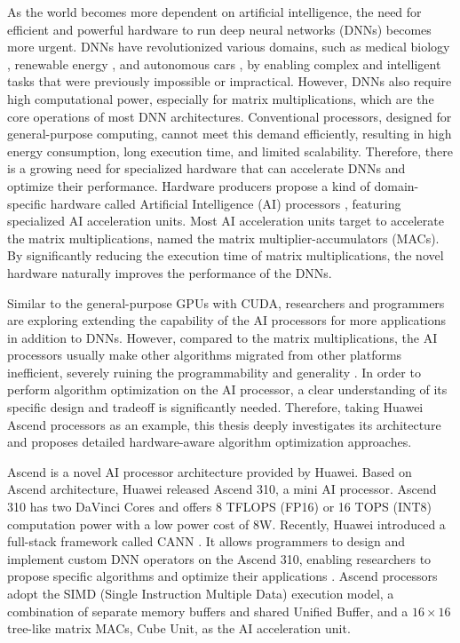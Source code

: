 \documentclass[12pt]{extbook}
\begin{document}
As the world becomes more dependent on artificial intelligence, the need for efficient and powerful hardware to run deep neural networks (DNNs) becomes more urgent. DNNs have revolutionized various domains, such as medical biology \cite{zitnik2019machine}, renewable energy \cite{gensler2016deep}, and autonomous cars \cite{tian2018deeptest}, by enabling complex and intelligent tasks that were previously impossible or impractical. However, DNNs also require high computational power, especially for matrix multiplications, which are the core operations of most DNN architectures. Conventional processors, designed for general-purpose computing, cannot meet this demand efficiently, resulting in high energy consumption, long execution time, and limited scalability. Therefore, there is a growing need for specialized hardware that can accelerate DNNs and optimize their performance. Hardware producers propose a kind of domain-specific hardware called Artificial Intelligence (AI) processors \cite{DBLP:journals/cacm/HennessyP19, DBLP:journals/micro/ChoquetteGGSK21, DBLP:conf/isca/JouppiYPPABBBBB17, DBLP:conf/isca/LiuDTHLXCC16, DBLP:conf/hotchips/LiaoTXZ19}, featuring specialized AI acceleration units. Most AI acceleration units target to accelerate the matrix multiplications, named the matrix multiplier-accumulators (MACs). By significantly reducing the execution time of matrix multiplications, the novel hardware naturally improves the performance of the DNNs. 

Similar to the general-purpose GPUs with CUDA, researchers and programmers are exploring extending the capability of the AI processors for more applications in addition to DNNs. However, compared to the matrix multiplications, the AI processors usually make other algorithms migrated from other platforms inefficient, severely ruining the programmability and generality \cite{DBLP:conf/icpp/JiW21, DBLP:conf/hotchips/LiaoTXZ19, DBLP:conf/isca/JouppiYPPABBBBB17, DBLP:conf/isca/LiuDTHLXCC16, cambricon, CANN, jax}. In order to perform algorithm optimization on the AI processor, a clear understanding of its specific design and tradeoff is significantly needed. Therefore, taking Huawei Ascend processors \cite{DBLP:conf/hotchips/LiaoTXZ19} as an example, this thesis deeply investigates its architecture and proposes detailed hardware-aware algorithm optimization approaches.

Ascend \cite{DBLP:conf/hotchips/LiaoTXZ19} is a novel AI processor architecture provided by Huawei. Based on Ascend architecture, Huawei released Ascend 310, a mini AI processor. Ascend 310 has two DaVinci Cores and offers 8 TFLOPS (FP16) or 16 TOPS (INT8) computation power with a low power cost of 8W. Recently, Huawei introduced a full-stack framework called CANN \cite{CANN}. It allows programmers to design and implement custom DNN operators on the Ascend 310, enabling researchers to propose specific algorithms and optimize their applications \cite{DBLP:conf/ipps/RohwedderCAACW21, DBLP:conf/icpp/JiW21}. Ascend processors adopt the SIMD (Single Instruction Multiple Data) execution model, a combination of separate memory buffers and shared Unified Buffer, and a $16 \times 16$ tree-like matrix MACs, Cube Unit, as the AI acceleration unit.
\end{document}
